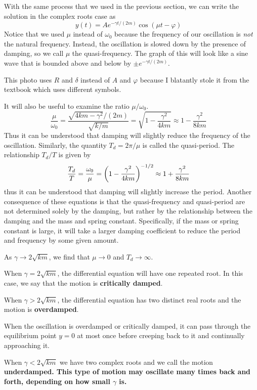 With the same process that we used in the previous section, we can write the solution in the complex roots case as
\[ y(t) = Ae^{-\gamma t/(2m)}\cos(\mu t - \varphi) \]
Notice that we used $\mu$ instead of $\omega_0$ because the frequency of our oscillation is \textit{not} the natural frequency. Instead, the oscillation is slowed down by the presence of damping, so we call $\mu$ the quasi-frequency. The graph of this will look like a sine wave that is bounded above and below by $\pm e^{-\gamma t/(2m)}$. \par
{} \par
This photo uses $R$ and $\delta$ instead of $A$ and $\varphi$ because I blatantly stole it from the textbook which uses different symbols. \par
It will also be useful to examine the ratio $\mu/\omega_0$. 
\[ \frac{\mu}{\omega_0} = \frac{\sqrt{4km-\gamma^2}/(2m)}{\sqrt{k/m}} = \sqrt{1-\frac{\gamma^2}{4km}} \approx 1 - \frac{\gamma^2}{8km} \]
Thus it can be understood that damping will slightly reduce the frequency of the oscillation. Similarly, the quantity $T_d = 2\pi/\mu$ is called the quasi-period. The relationship $T_d/T$ is given by
\[ \frac{T_d}{T} = \frac{\omega_0}{\mu} = \pqty{1-\frac{\gamma^2}{4km}}^{-1/2} \approx 1 + \frac{\gamma^2}{8km} \]
thus it can be understood that damping will slightly increase the period. Another consequence of these equations is that the quasi-frequency and quasi-period are not determined solely by the damping, but rather by the relationship between the damping and the mass and spring constant. Specifically, if the mass or spring constant is large, it will take a larger damping coefficient to reduce the period and frequency by some given amount. \par
As $\gamma \to 2\sqrt{km}$, we find that $\mu\to 0$ and $T_d \to \infty$. \par 
When $\gamma = 2\sqrt{km}$, the differential equation will have one repeated root. In this case, we say that the motion is \textbf{critically damped}. \par
When $\gamma > 2\sqrt{km}$, the differential equation has two distinct real roots and the motion is \textbf{overdamped}. \par
When the oscillation is overdamped or critically damped, it can pass through the equilibrium point $y=0$ at most once before creeping back to it and continually approaching it. \par
When $\gamma < 2\sqrt{km}$ we have two complex roots and we call the motion \bf{underdamped}. This type of motion may oscillate many times back and forth, depending on how small $\gamma$ is.  
